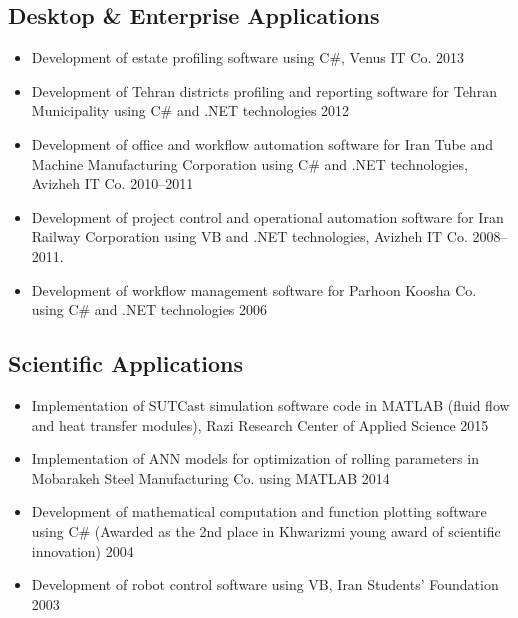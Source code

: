 \documentclass{cv}
\begin{document}
\subsection{Desktop \& Enterprise Applications}

\begin{itemize}

\item
Development of estate profiling software using C\#, Venus IT Co. \hfill 2013
\item
Development of Tehran districts profiling and reporting software for Tehran Municipality using C\# and .NET technologies \hfill 2012
\item
Development of office and workflow automation software for Iran Tube and Machine Manufacturing Corporation using C\# and .NET technologies, Avizheh IT Co. \hfill 2010--2011
\item
Development of project control and operational automation software for Iran Railway Corporation using VB and .NET technologies, Avizheh IT Co. \hfill 2008--2011.
\item
Development of workflow management software for Parhoon Koosha Co. using C\# and .NET technologies \hfill 2006

\end{itemize}


\subsection{Scientific Applications}

\begin{itemize}
\item
Implementation of SUTCast simulation software code in MATLAB (fluid flow and heat transfer modules), Razi Research Center of Applied Science \hfill 2015
\item
Implementation of ANN models for optimization of rolling parameters in Mobarakeh Steel Manufacturing Co. using MATLAB \hfill 2014
\item
Development of mathematical computation and function plotting software using C\# (Awarded as the 2nd place in Khwarizmi young award of scientific innovation) \hfill 2004
\item
Development of robot control software using VB, Iran Students' Foundation \hfill 2003

\end{itemize}


\end{document}
